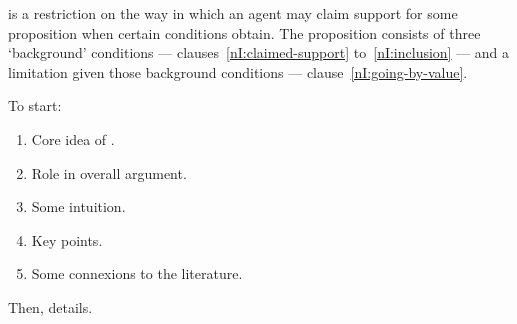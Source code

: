 \begin{note}
  \nI{} is a restriction on the way in which an agent may claim support for some proposition when certain conditions obtain.
  The proposition consists of three `background' conditions --- clauses~\ref{nI:claimed-support} to~\ref{nI:inclusion} --- and a limitation given those background conditions --- clause~\ref{nI:going-by-value}.
\end{note}

\begin{note}[Plan]
  To start:
  \begin{enumerate}
  \item Core idea of \nI{}.
  \item Role in overall argument.
  \item Some intuition.
  \item Key points.
  \item Some connexions to the literature.
  \end{enumerate}
  Then, details.
\end{note}

